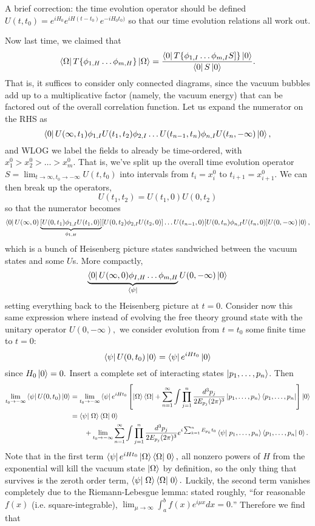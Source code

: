 A brief correction: the time evolution operator should be defined
$U(t,t_0)=e^{iH_0}e^{iH(t-t_0)}e^{-iH_0 t_0)}$ so that our time evolution relations all work out.

Now last time, we claimed that
$$\left< \Omega \right|T\{\phi_{1,H}\ldots \phi_{m,H}\}\left| \Omega \right>=\frac{\left< 0 \right|T \{\phi_{1,I}\ldots \phi_{m,I}S]\}\left| 0 \right>}{\left< 0 \right|S\left| 0 \right>}.$$
That is, it suffices to consider only connected diagrams, since the vacuum bubbles add up to a multiplicative factor (namely, the vacuum energy) that can be factored out of the overall correlation function.
Let us expand the numerator on the RHS as
$$\left< 0 \right|U(\infty, t_1) \phi_{1,I} U(t_1,t_2)\phi_{2,I} \ldots U(t_{n-1},t_n)\phi_{n,I} U(t_n,-\infty)\left| 0 \right>,$$
and WLOG we label the fields to already be time-ordered, with $x_1^0 > x_2^0 > \ldots > x_m^0$. That is, we've split up the overall time evolution operator $S=\lim_{t\to \infty, t_0\to-\infty} U(t,t_0)$ into intervals from $t_i=x_i^0$ to $t_{i+1}=x_{i+1}^0$. We can then break up the operators,
$$U(t_1,t_2)=U(t_1,0)U(0,t_2)$$ so that the numerator becomes
$$\left< 0 \right|U(\infty, 0) \underbrace{[U(0,t_1)\phi_{1,I} U(t_1,0)]}_{\phi_{1,H}} [U(0,t_2)\phi_{2,I} U(t_2,0)]\ldots U(t_{n-1},0)[U(0,t_n)\phi_{n,I} U(t_n,0)]U(0,-\infty)\left| 0 \right>,$$
which is a bunch of Heisenberg picture states sandwiched between the vacuum states and some $U$s.
More compactly,
$$\underbrace{\left< 0 \right|U(\infty,0)\phi_{I,H}\ldots \phi_{m,H}}_{\left< \psi \right|}U(0,-\infty)\left| 0 \right>$$
setting everything back to the Heisenberg picture at $t=0$. Consider now this same expression where instead of evolving the free theory ground state with the unitary operator $U(0,-\infty),$ we consider evolution from $t=t_0$ some finite time to $t=0$:
$$\left< \psi \right|U(0,t_0)\left| 0 \right>=\left< \psi \right|e^{iHt_0}\left| 0 \right>$$
since $H_0\left| 0 \right>=0.$ Insert a complete set of interacting states $\left| p_1,\ldots, p_n \right>$. Then 
\begin{align*}
\lim_{t_0\to-\infty} \bra{\psi}U(0,t_0)\ket{0}&=
\lim_{t_0\to-\infty}\bra{\psi}e^{iHt_0}\left[\ket{\Omega}\bra{\Omega}+\sum_{n=1}^\infty \int  \prod_{j=1}^n \frac{d^3p_j}{2E_{p_j}(2\pi)^3}\ket{p_1,\ldots,p_n}\bra{p_1,\ldots,p_n}\right]\ket{0}\\
&=\braket{\psi}{\Omega}\braket{\Omega}{0}\\
&\qquad {}+
\lim_{t_0\to-\infty}\sum_{n=1}^\infty \int  \prod_{j=1}^n \frac{d^3p_j}{2E_{p_j}(2\pi)^3} e^{i\sum_{k=1}^n E_{p_k} t_0}\braket{\psi}{p_1,\ldots,p_n}\braket{p_1,\ldots,p_n}{0}.
\end{align*}
Note that in the first term $\bra{\psi} e^{iHt_0}\ket{\Omega}\braket{\Omega}{0},$ all nonzero powers of $H$ from the exponential will kill the vacuum state $\left| \Omega \right>$ by definition, so the only thing that survives is the zeroth order term, $\braket{\psi}{\Omega}\braket{\Omega}{0}.$ Luckily, the second term vanishes completely due to the Riemann-Lebesgue lemma: stated roughly, ``for reasonable $f(x)$ (i.e. square-integrable), $\lim_{\mu\to\infty} \int_a^b f(x)e^{i\mu x}dx=0.$'' Therefore we find that
